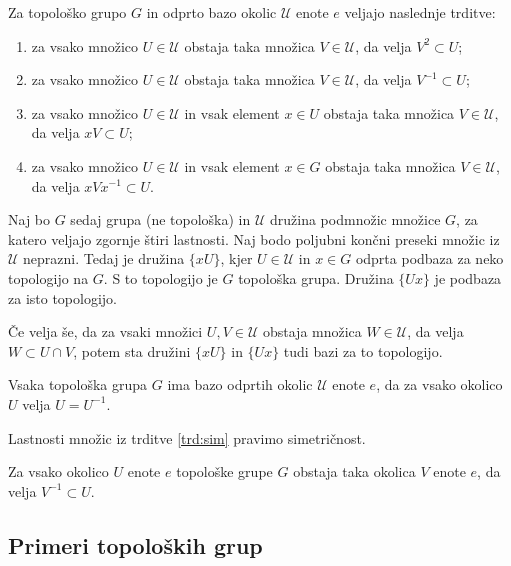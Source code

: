 \documentclass[mat1]{fmfdelo}
\newcommand{\Ucurl}{\mathcal{U}}
\begin{document}
\begin{trditev}\label{trd:okolice}
Za topološko grupo $G$ in odprto bazo okolic $\Ucurl$ enote $e$ veljajo naslednje trditve:
\begin{enumerate}
\item za vsako množico $U \in \Ucurl$ obstaja taka množica $V \in \Ucurl$, da velja $V^{2} \subset U$;
\item za vsako množico $U \in \Ucurl$ obstaja taka množica $V \in \Ucurl$, da velja $V^{-1} \subset U$;
\item za vsako množico $U \in \Ucurl$ in vsak element $x \in U$ obstaja taka množica $V \in \Ucurl$, da velja $xV \subset U$;
\item za vsako množico $U \in \Ucurl$ in vsak element $x \in G$ obstaja taka množica $V \in \Ucurl$, da velja $xVx^{-1} \subset U$.
\end{enumerate}

Naj bo $G$ sedaj grupa (ne topološka) in $\Ucurl$ družina podmnožic množice $G$, za katero veljajo zgornje štiri lastnosti. Naj bodo poljubni končni preseki množic iz $\Ucurl$ neprazni. Tedaj je družina $\lbrace xU \rbrace$, kjer $U \in \Ucurl$ in $x \in G$ odprta podbaza za neko topologijo na $G$. S to topologijo je $G$ topološka grupa. Družina $\lbrace Ux \rbrace$ je podbaza za isto topologijo.

Če velja še, da za vsaki množici $U,V \in \Ucurl$ obstaja množica $W \in \Ucurl$, da velja $W \subset U \cap V$, potem sta družini $\lbrace xU \rbrace$ in $\lbrace Ux \rbrace$ tudi bazi za to topologijo.
\end{trditev}

\begin{trditev}\label{trd:sim}
Vsaka topološka grupa $G$ ima bazo odprtih okolic $\Ucurl$ enote $e$, da za vsako okolico $U$ velja $U = U^{-1}$.
\end{trditev}

\begin{opomba}
Lastnosti množic iz trditve \ref{trd:sim} pravimo simetričnost.
\end{opomba}

\begin{posledica}\label{pos:sim}
Za vsako okolico $U$ enote $e$ topološke grupe $G$ obstaja taka okolica $V$ enote $e$, da velja $V^{-1} \subset U$.
\end{posledica}


\subsection{Primeri topoloških grup}
\end{document}
